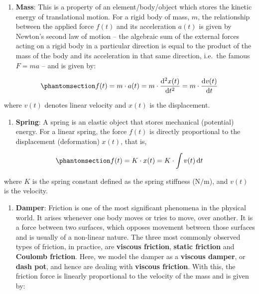 \documentclass[
  14pt,
  a4paper,
  oneside,
  open=any,
  a4paper,
  14pt]{report}
\providecommand{\tightlist}{%
  \setlength{\itemsep}{0pt}\setlength{\parskip}{0pt}}\usepackage{longtable,booktabs,array}
\begin{document}
\begin{enumerate}
\def\labelenumi{\arabic{enumi}.}
\tightlist
\item
  \textbf{Mass}: This is a property of an element/body/object which
  stores the kinetic energy of translational motion. For a rigid body of
  mass, \(m\), the relationship between the applied force \(f(t)\) and
  its acceleration \(a(t)\) is given by Newton's second law of motion --
  the algebraic sum of the external forces acting on a rigid body in a
  particular direction is equal to the product of the mass of the body
  and its acceleration in that same direction, i.e.~the famous \(F=ma\)
  -- and is given by:
\end{enumerate}

\begin{equation}\phantomsection\label{eq-mechsys-mass}{
    f(t) = m\cdot a(t) = m \cdot \odv[2]{x(t)}{t} = m \cdot \odv{v(t)}{t}
}\end{equation}

where \(v(t)\) denotes linear velocity and \(x(t)\) is the displacement.

\begin{enumerate}
\def\labelenumi{\arabic{enumi}.}
\setcounter{enumi}{1}
\tightlist
\item
  \textbf{Spring}: A spring is an elastic object that stores mechanical
  (potential) energy. For a linear spring, the force \(f(t)\) is
  directly proportional to the displacement (deformation) \(x(t)\), that
  is,
\end{enumerate}

\begin{equation}\phantomsection\label{eq-mechsys-spring}{
    f(t) = K\cdot x(t) = K\cdot \int v(t) \odif{t}
}\end{equation}

where \(K\) is the spring constant defined as the spring stiffness
(\(\unit{\newton\per\meter}\)), and \(v(t)\) is the velocity.

\begin{enumerate}
\def\labelenumi{\arabic{enumi}.}
\setcounter{enumi}{2}
\tightlist
\item
  \textbf{Damper}: Friction is one of the most significant phenomena in
  the physical world. It arises whenever one body moves or tries to
  move, over another. It is a force between two surfaces, which opposes
  movement between those surfaces and is usually of a non-linear nature.
  The three most commonly observed types of friction, in practice, are
  \textbf{viscous friction}, \textbf{static friction} and
  \textbf{Coulomb friction}. Here, we model the damper as a
  \textbf{viscous damper}, or \textbf{dash pot}, and hence are dealing
  with \textbf{viscous friction}. With this, the friction force is
  linearly proportional to the velocity of the mass and is given by:
\end{enumerate}
\end{document}
